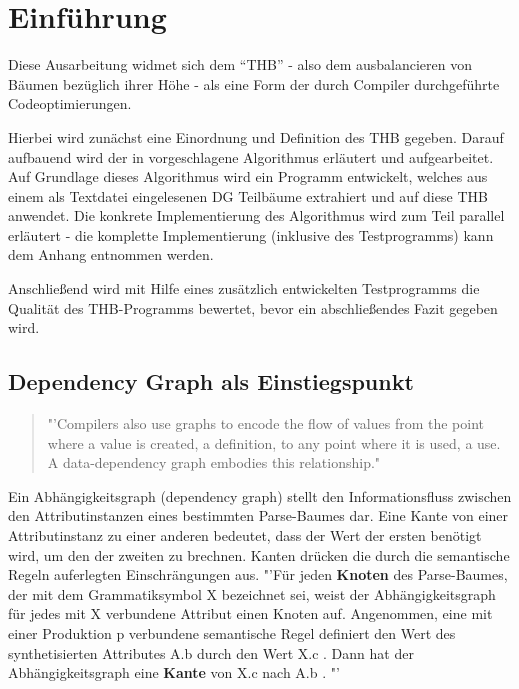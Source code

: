 \chapter{Einführung}

Diese Ausarbeitung widmet sich dem \enquote{\ac{THB}} - also dem ausbalancieren von Bäumen bezüglich ihrer Höhe - als eine Form der durch Compiler durchgeführte Codeoptimierungen.

Hierbei wird zunächst eine Einordnung und Definition des \ac{THB} gegeben. Darauf aufbauend wird der in \cite{HeBIS-309344573} vorgeschlagene Algorithmus erläutert und aufgearbeitet. Auf Grundlage dieses Algorithmus wird ein Programm entwickelt, welches aus einem als Textdatei eingelesenen \ac{DG} Teilbäume extrahiert und auf diese \ac{THB} anwendet. Die konkrete Implementierung des Algorithmus wird zum Teil parallel erläutert - die komplette Implementierung (inklusive des Testprogramms) kann dem Anhang entnommen werden.

Anschließend wird mit Hilfe eines zusätzlich entwickelten Testprogramms die Qualität des \ac{THB}-Programms bewertet, bevor ein abschließendes Fazit gegeben wird.



\label{Einfuehrung}






\newpage
\section{Dependency Graph als Einstiegspunkt}
\begin{quotation}
	"'Compilers also use graphs to encode the flow of values from the point where a value is created, a definition, to any point where it is used, a use. A data-dependency graph embodies this relationship." \cite{HeBIS-309344573}
\end{quotation}
Ein Abhängigkeitsgraph (dependency graph) stellt den Informationsfluss zwischen den Attributinstanzen eines bestimmten Parse-Baumes dar. Eine Kante von einer Attributinstanz zu einer anderen bedeutet, dass der Wert der ersten benötigt wird, um den der zweiten zu brechnen. Kanten drücken die durch die semantische Regeln auferlegten Einschrängungen aus. "'Für jeden \textbf{Knoten} des Parse-Baumes, der mit dem Grammatiksymbol X bezeichnet sei, weist der Abhängigkeitsgraph für jedes mit X verbundene Attribut einen Knoten auf. Angenommen, eine mit einer Produktion p verbundene semantische Regel definiert den Wert des synthetisierten Attributes A.b durch den Wert X.c . Dann hat der Abhängigkeitsgraph eine \textbf{Kante} von X.c nach A.b . \cite{HeBIS-194410269}"' 

